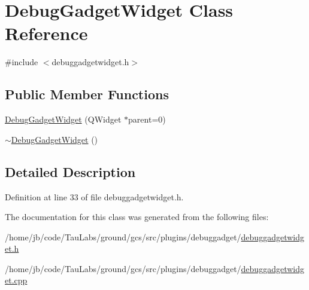 \hypertarget{class_debug_gadget_widget}{\section{\-Debug\-Gadget\-Widget \-Class \-Reference}
\label{class_debug_gadget_widget}
}


{\ttfamily \#include $<$debuggadgetwidget.\-h$>$}

\subsection*{\-Public \-Member \-Functions}
\begin{DoxyCompactItemize}
\item 
\hyperlink{group___debug_gadget_plugin_ga67e29acbc33b5ca194215ea1c70e9e72}{\-Debug\-Gadget\-Widget} (\-Q\-Widget $\ast$parent=0)
\item 
\hyperlink{group___debug_gadget_plugin_ga74a70926720377a2a71c0946408b8127}{$\sim$\-Debug\-Gadget\-Widget} ()
\end{DoxyCompactItemize}


\subsection{\-Detailed \-Description}


\-Definition at line 33 of file debuggadgetwidget.\-h.



\-The documentation for this class was generated from the following files\-:\begin{DoxyCompactItemize}
\item 
/home/jb/code/\-Tau\-Labs/ground/gcs/src/plugins/debuggadget/\hyperlink{debuggadgetwidget_8h}{debuggadgetwidget.\-h}\item 
/home/jb/code/\-Tau\-Labs/ground/gcs/src/plugins/debuggadget/\hyperlink{debuggadgetwidget_8cpp}{debuggadgetwidget.\-cpp}\end{DoxyCompactItemize}
